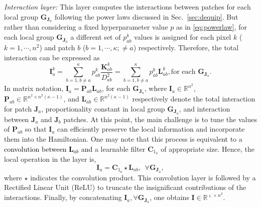 \documentclass[10pt,journal,compsoc]{IEEEtran}
\newcommand{\dk}{\textcolor{black}}
\def\bsI{{\boldsymbol{I}}}
\def\bsJ{{\boldsymbol{J}}}
\def\bsK{{\boldsymbol{K}}}
\def\bsL{{\boldsymbol{L}}}
\def\bsP{{\boldsymbol{P}}}
\def\bsC{{\boldsymbol{C}}}
\def\bsG{{\boldsymbol{G}}}
\def\bsP{{\boldsymbol{P}}}
\begin{document}
\textit{Interaction layer:}
This layer computes the interactions between patches for each local group $\bsG_{\bsJ_a}$ following the power laws discussed in Sec.~\ref{sec:dequip}. But rather than considering a fixed hyperparameter value $p$ as in \eqref{eq:powerlaw}, for each local group $\bsG_{\bsJ_a}$ a different set of $p_{ab}^k$ values is assigned for each pixel $k$ ($k = 1,\cdots, n^2$) and patch $b$ ($b = 1,\cdots, \kappa; \neq a$) respectively. Therefore, the total interaction can be expressed as
\begin{equation}
\bsI_a^k = \sum_{b=1, b\neq a}^\kappa p_{ab}^k  \dfrac{\bsK_{ab}^k}{D_{ab}^2} = \sum_{b=1, b\neq a}^\kappa p_{ab}^k \bsL_{ab}^k, \mbox{for each }\bsG_{\bsJ_a}.
\label{eq:interaction}
\end{equation}
In matrix notation, $\bsI_a = \bsP_{ab} \bsL_{ab}$, for each $\bsG_{\bsJ_a}$, where $\bsI_a \in \mathbb{R}^{n^2}$, $\bsP_{ab} \in \mathbb{R}^{n^2 \times n^2 (\kappa-1)}$, and $\bsL_{ab} \in \mathbb{R}^{n^2 (\kappa-1)}$ respectively denote the total interaction for patch $\bsJ_a$, proportionality constant in local group $\bsG_{\bsJ_a}$, and interaction between $\bsJ_a$ and $\bsJ_b$ patches. At this point, the main challenge is to tune the values of $\bsP_{ab}$ so that $\bsI_{a}$ can efficiently preserve the local information and incorporate them into the Hamiltonian. One may note that this process is equivalent to a \dk{ convolution between $\bsL_{ab}$ and} a learnable filter $\bsC_{1_a}$ of appropriate size. Hence, the local operation in the layer is,
\begin{equation}
\bsI_a = \bsC_{1_a} \star \bsL_{ab}, ~~\forall \bsG_{\bsJ_a},
\end{equation}
where $\star$ indicates the convolution product. This convolution layer is followed by a Rectified Linear Unit (ReLU) to truncate the insignificant contributions of the interactions. Finally, by concatenating $\bsI_a, \forall \bsG_{\bsJ_a}$, one obtains $\bsI \in \mathbb{R}^{\varsigma \times n^2}$.


\end{document}
